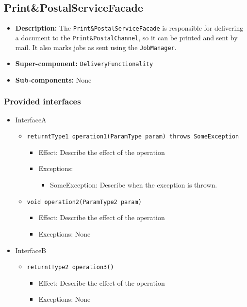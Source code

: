 \documentclass[a4paper,10pt]{article}
\begin{document}
\subsection{Print\&PostalServiceFacade}
\begin{itemize}
    \item \textbf{Description:} The \texttt{Print\&PostalServiceFacade} is responsible for delivering a document to the \texttt{Print\&PostalChannel}, so it can be printed and sent by mail. It also marks jobs as sent using the \texttt{JobManager}.
    \item \textbf{Super-component:} \texttt{DeliveryFunctionality}
    \item \textbf{Sub-components:} None
\end{itemize}

\subsubsection*{Provided interfaces}
\begin{itemize}
    \item InterfaceA
    \begin{itemize}
        \item \texttt{returntType1 operation1(ParamType param) throws SomeException}
        \begin{itemize}
            \item Effect: Describe the effect of the operation
            \item Exceptions:
            \begin{itemize}
                \item SomeException: Describe when the exception is thrown.
            \end{itemize}
		\end{itemize}
		
        \item \texttt{void operation2(ParamType2 param)}
        \begin{itemize}
            \item Effect: Describe the effect of the operation
            \item Exceptions: None
        \end{itemize}
    \end{itemize}

    \item InterfaceB
    \begin{itemize}
        \item \texttt{returntType2 operation3()}
        \begin{itemize}
            \item Effect: Describe the effect of the operation
            \item Exceptions: None
        \end{itemize}
    \end{itemize}
\end{itemize}
\end{document}
